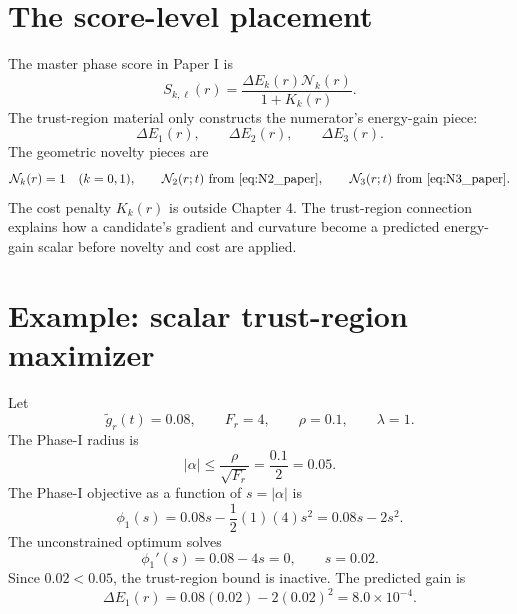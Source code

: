 \documentclass[10pt,twocolumn]{article}
\begin{document}
\section{The score-level placement}

The master phase score in Paper I is
\begin{equation}
S_{k,\ell}(r)
=
\frac{\Delta E_k(r)\mathcal N_k(r)}{1+K_k(r)}.
\label{eq:master_score_paper}
\end{equation}
The trust-region material only constructs the numerator's energy-gain piece:
\begin{equation}
\Delta E_1(r),\qquad
\Delta E_2(r),\qquad
\Delta E_3(r).
\label{eq:energy_pieces}
\end{equation}
The geometric novelty pieces are
\begin{equation}
\mathcal N_k(r)=1\quad(k=0,1),
\qquad
\mathcal N_2(r;t)\text{ from \eqref{eq:N2_paper}},
\qquad
\mathcal N_3(r;t)\text{ from \eqref{eq:N3_paper}}.
\label{eq:novelty_pieces}
\end{equation}
The cost penalty \(K_k(r)\) is outside Chapter 4. The trust-region connection explains how a candidate's gradient and curvature become a predicted energy-gain scalar before novelty and cost are applied.

\appendix

\section{Example: scalar trust-region maximizer}

Let
\begin{equation}
\widetilde g_r(t)=0.08,\qquad
F_r=4,\qquad
\rho=0.1,\qquad
\lambda=1.
\label{eq:ex1_data}
\end{equation}
The Phase-I radius is
\begin{equation}
|\alpha|\le\frac{\rho}{\sqrt{F_r}}=\frac{0.1}{2}=0.05.
\label{eq:ex1_radius}
\end{equation}
The Phase-I objective as a function of \(s=|\alpha|\) is
\begin{equation}
\phi_1(s)=0.08s-\frac12(1)(4)s^2
=0.08s-2s^2.
\label{eq:ex1_phi}
\end{equation}
The unconstrained optimum solves
\begin{equation}
\phi_1'(s)=0.08-4s=0,
\qquad
s=0.02.
\label{eq:ex1_uncon}
\end{equation}
Since \(0.02<0.05\), the trust-region bound is inactive. The predicted gain is
\begin{equation}
\Delta E_1(r)=0.08(0.02)-2(0.02)^2=8.0\times10^{-4}.
\label{eq:ex1_gain}
\end{equation}
\end{document}
